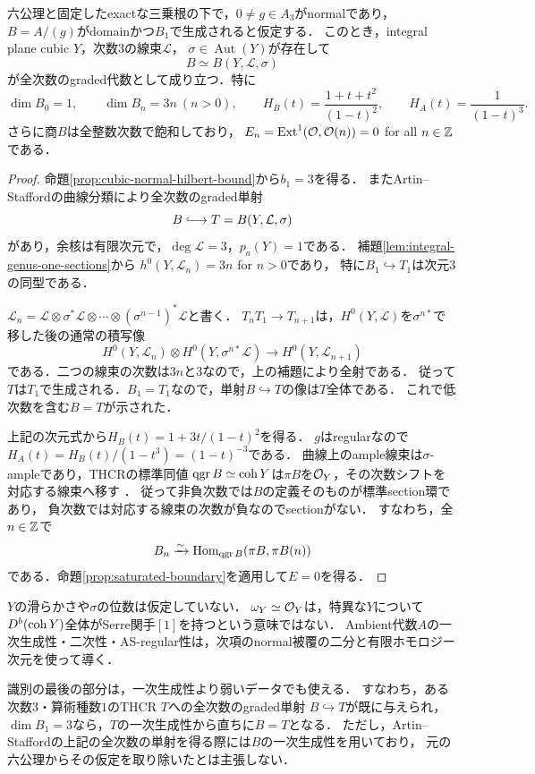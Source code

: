 \documentclass[11pt,a4paper]{ltjsarticle}
\begin{document}
\begin{proposition}[一次生成された三次normal境界の識別]
\label{prop:cubic-boundary-full-identification}
六公理と固定したexactな三乗根の下で，$0\ne g\in A_3$がnormalであり，
$B=A/(g)$がdomainかつ$B_1$で生成されると仮定する．
このとき，integral plane cubic $Y$，次数$3$の線束$\mathcal L$，
$\sigma\in\operatorname{Aut}(Y)$が存在して
\[
 B\simeq B(Y,\mathcal L,\sigma)
\]
が全次数のgraded代数として成り立つ．特に
\[
 \dim B_0=1,\qquad \dim B_n=3n\ (n>0),\qquad
 H_B(t)=\frac{1+t+t^2}{(1-t)^2},\qquad
 H_A(t)=\frac1{(1-t)^3}.
\]
さらに商$B$は全整数次数で飽和しており，
$E_n=\operatorname{Ext}^1(\mathcal O,\mathcal O(n))=0$ for all $n\in\mathbb Z$である．
\end{proposition}

\begin{proof}
命題\ref{prop:cubic-normal-hilbert-bound}から$b_1=3$を得る．
またArtin--Staffordの曲線分類により全次数のgraded単射
\[
 B\lhook\joinrel\longrightarrow T=B(Y,\mathcal L,\sigma)
\]
があり，余核は有限次元で，$\deg\mathcal L=3$，$p_a(Y)=1$である．
補題\ref{lem:integral-genus-one-sections}から
$h^0(Y,\mathcal L_n)=3n$ for $n>0$であり，
特に$B_1\hookrightarrow T_1$は次元$3$の同型である．

$\mathcal L_n=\mathcal L\otimes\sigma^*\mathcal L\otimes\cdots
\otimes(\sigma^{n-1})^*\mathcal L$と書く．
$T_nT_1\to T_{n+1}$は，$H^0(Y,\mathcal L)$を$\sigma^{n*}$で移した後の通常の積写像
\[
 H^0(Y,\mathcal L_n)\otimes H^0(Y,\sigma^{n*}\mathcal L)
  \longrightarrow H^0(Y,\mathcal L_{n+1})
\]
である．二つの線束の次数は$3n$と$3$なので，上の補題により全射である．
従って$T$は$T_1$で生成される．$B_1=T_1$なので，単射$B\hookrightarrow T$の像は$T$全体である．
これで低次数を含む$B=T$が示された．

上記の次元式から$H_B(t)=1+3t/(1-t)^2$を得る．
$g$はregularなので$H_A(t)=H_B(t)/(1-t^3)=(1-t)^{-3}$である．
曲線上のample線束は$\sigma$-ampleであり，THCRの標準同値
$\operatorname{qgr} B\simeq\operatorname{coh} Y$は$\pi B$を$\mathcal O_Y$，その次数シフトを対応する線束へ移す
\cite[Theorem 3.2, Corollary 5.3]{SVdBsurvey}．
従って非負次数では$B$の定義そのものが標準section環であり，
負次数では対応する線束の次数が負なのでsectionがない．
すなわち，全$n\in\mathbb Z$で
\[
 B_n\xrightarrow{\sim}
 \operatorname{Hom}_{\operatorname{qgr} B}(\pi B,\pi B(n))
\]
である．命題\ref{prop:saturated-boundary}を適用して$E=0$を得る．
\end{proof}

\begin{remark}[適用範囲]
$Y$の滑らかさや$\sigma$の位数は仮定していない．
$\omega_Y\simeq\mathcal O_Y$は，特異な$Y$について
$D^b(\operatorname{coh} Y)$全体がSerre関手$[1]$を持つという意味ではない．
Ambient代数$A$の一次生成性・二次性・AS-regular性は，次項のnormal被覆の二分と有限ホモロジー次元を使って導く．

識別の最後の部分は，一次生成性より弱いデータでも使える．
すなわち，ある次数$3$・算術種数$1$のTHCR $T$への全次数のgraded単射
$B\hookrightarrow T$が既に与えられ，$\dim B_1=3$なら，$T$の一次生成性から直ちに$B=T$となる．
ただし，Artin--Staffordの上記の全次数の単射を得る際には$B$の一次生成性を用いており，
元の六公理からその仮定を取り除いたとは主張しない．
\end{remark}
\end{document}
